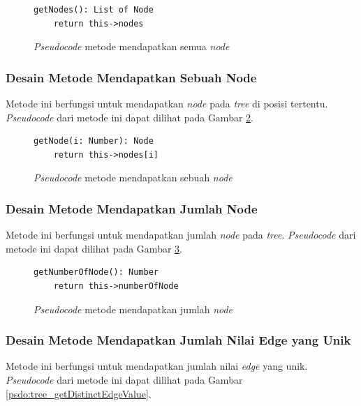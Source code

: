 \begin{figure}[ht]
	\begin{lstlisting}[firstnumber=0]
	getNodes(): List of Node
	return this->nodes
	\end{lstlisting}
	\caption{\textit{Pseudocode} metode mendapatkan semua \textit{node}}
	\label{psdo:tree_getNodes}
\end{figure}

\subsubsection{Desain Metode Mendapatkan Sebuah Node}
Metode ini berfungsi untuk mendapatkan \textit{node} pada \textit{tree} di posisi tertentu. \textit{Pseudocode} dari metode ini dapat dilihat pada Gambar \ref{psdo:tree_getNode}.

\begin{figure}[ht]
	\begin{lstlisting}[firstnumber=0]
	getNode(i: Number): Node
	return this->nodes[i]
	\end{lstlisting}
	\caption{\textit{Pseudocode} metode mendapatkan sebuah \textit{node}}
	\label{psdo:tree_getNode}
\end{figure}

\subsubsection{Desain Metode Mendapatkan Jumlah Node}
Metode ini berfungsi untuk mendapatkan jumlah \textit{node} pada \textit{tree}. \textit{Pseudocode} dari metode ini dapat dilihat pada Gambar \ref{psdo:tree_getNumberOfNode}.

\begin{figure}[ht]
	\begin{lstlisting}[firstnumber=0]
	getNumberOfNode(): Number
	return this->numberOfNode
	\end{lstlisting}
	\caption{\textit{Pseudocode} metode mendapatkan jumlah \textit{node}}
	\label{psdo:tree_getNumberOfNode}
\end{figure}

\subsubsection{Desain Metode Mendapatkan Jumlah Nilai Edge yang Unik}
Metode ini berfungsi untuk mendapatkan jumlah nilai \textit{edge} yang unik. \textit{Pseudocode} dari metode ini dapat dilihat pada Gambar \ref{psdo:tree_getDistinctEdgeValue}.

